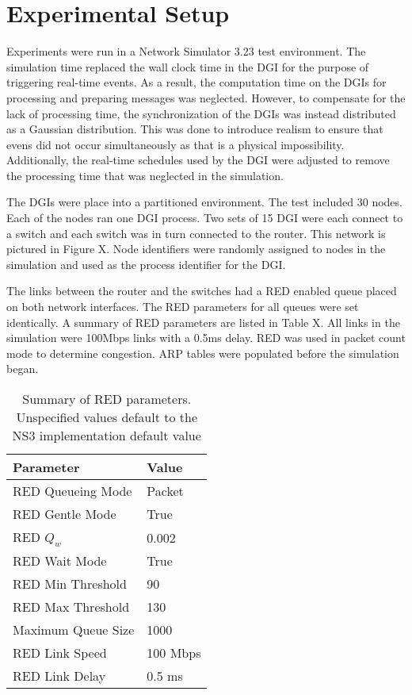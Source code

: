 
\section{Experimental Setup}

Experiments were run in a Network Simulator 3.23 test environment.
The simulation time replaced the wall clock time in the \ac{DGI} for the purpose of triggering real-time events.
As a result, the computation time on the \ac{DGI}s for processing and preparing messages was neglected.
However, to compensate for the lack of processing time, the synchronization of the \ac{DGI}s was instead distributed as a Gaussian distribution.
This was done to introduce realism to ensure that evens did not occur simultaneously as that is a physical impossibility.
Additionally, the real-time schedules used by the \ac{DGI} were adjusted to remove the processing time that was neglected in the simulation.

The \ac{DGI}s were place into a partitioned environment.
The test included 30 nodes.
Each of the nodes ran one \ac{DGI} process.
Two sets of 15 \ac{DGI} were each connect to a switch and each switch was in turn connected to the router.
This network is pictured in Figure X.
Node identifiers were randomly assigned to nodes in the simulation and used as the process identifier for the \ac{DGI}.

The links between the router and the switches had a \ac{RED} enabled queue placed on both network interfaces.
The \ac{RED} parameters for all queues were set identically.
A summary of \ac{RED} parameters are listed in Table X.
All links in the simulation were 100Mbps links with a 0.5ms delay.
RED was used in packet count mode to determine congestion.
ARP tables were populated before the simulation began.

\begin{table*}
\begin{tabular}{ | l | l | } \hline
Parameter & Value         \\ \hline
RED Queueing Mode & Packet\\ \hline 
RED Gentle Mode & True    \\ \hline
RED $Q_{w}$ & 0.002       \\ \hline
RED Wait Mode & True      \\ \hline
RED Min Threshold & 90    \\ \hline
RED Max Threshold & 130   \\ \hline
Maximum Queue Size & 1000 \\ \hline
RED Link Speed & 100 Mbps \\ \hline
RED Link Delay & 0.5 ms   \\ \hline
\end{tabular}
\caption{Summary of \ac{RED} parameters. Unspecified values default to the \ac{NS3} implementation default value}
\label{tab:red-parameters}
\end{table*}

